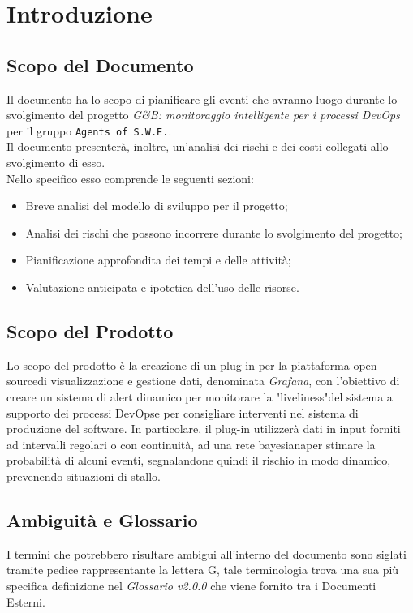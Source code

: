 \section{Introduzione
\label{Introduzione}}

\subsection{Scopo del Documento}
Il documento ha lo scopo di pianificare gli eventi che avranno luogo durante lo svolgimento del progetto \textit{G\&B: monitoraggio intelligente per i processi DevOps\glossario} per il gruppo \texttt{Agents of S.W.E.}.\\
Il documento presenterà, inoltre, un'analisi dei rischi e dei costi collegati allo svolgimento di esso. \\
Nello specifico esso comprende le seguenti sezioni:
\begin{itemize}
\item Breve analisi del modello di sviluppo per il progetto;
\item Analisi dei rischi che possono incorrere durante lo svolgimento del progetto;
\item Pianificazione approfondita dei tempi e delle attività;
\item Valutazione anticipata e ipotetica dell'uso delle risorse.
\end{itemize}
 
\subsection{Scopo del Prodotto} 
Lo scopo del prodotto è la creazione di un plug-in per la piattaforma open source\glossario di visualizzazione e gestione dati, denominata \textit{Grafana}\glossario, 
con l'obiettivo di creare un sistema di alert dinamico per monitorare la "liveliness"\glossario del sistema a supporto dei processi
DevOps\glossario e per consigliare interventi nel sistema di produzione del software.
In particolare, il plug-in utilizzerà dati in input forniti ad intervalli regolari o con continuità, ad una rete bayesiana\glossario per stimare la probabilità di alcuni eventi, segnalandone quindi il rischio in modo dinamico, prevenendo situazioni di stallo.   

 
\subsection{Ambiguità e Glossario}
I termini che potrebbero risultare ambigui all'interno del documento sono siglati tramite pedice rappresentante la lettera \textmd{G}, tale terminologia trova una sua più specifica definizione nel \textit{Glossario v2.0.0} che viene fornito tra i Documenti Esterni.


